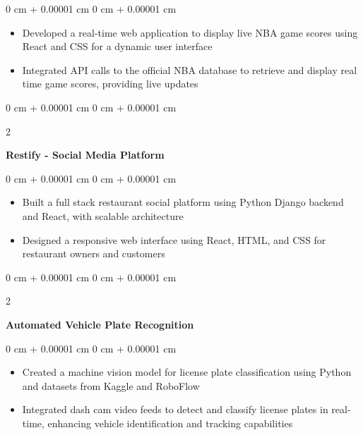 \documentclass[10pt, letterpaper]{article}
\newenvironment{highlights}{
    \begin{itemize}[
        topsep=0.10 cm,
        parsep=0.10 cm,
        partopsep=0pt,
        itemsep=0pt,
        leftmargin=0 cm + 10pt
    ]
}{
    \end{itemize}
} %
\newenvironment{onecolentry}{
    \begin{adjustwidth}{
        0 cm + 0.00001 cm
    }{
        0 cm + 0.00001 cm
    }
}{
    \end{adjustwidth}
} %
\newenvironment{twocolentry}[2][]{
    \onecolentry
    \def\secondColumn{#2}
    \setcolumnwidth{\fill, 4.5 cm}
    \begin{paracol}{2}
}{
    \switchcolumn \raggedleft \secondColumn
    \end{paracol}
    \endonecolentry
} %
\begin{document}
    \vspace{0.10 cm}
    \begin{onecolentry}
        \begin{highlights}
            \item Developed a real-time web application to display live NBA game scores using React and CSS for a dynamic user interface
            \item Integrated API calls to the official NBA database to retrieve and display real time game scores, providing live updates 
        \end{highlights}
    \end{onecolentry}
    
    \vspace{0.2 cm}
    
    \begin{twocolentry}{}
        \textbf{Restify - Social Media Platform}
    \end{twocolentry}
    
    \vspace{0.10 cm}
    \begin{onecolentry}
        \begin{highlights}
            \item Built a full stack restaurant social platform using Python Django backend and React, with scalable architecture
            \item Designed a responsive web interface using React, HTML, and CSS for restaurant owners and customers
        \end{highlights}
    \end{onecolentry}
    
    
    \vspace{0.2 cm}
    
    \begin{twocolentry}{}
        \textbf{Automated Vehicle Plate Recognition}
    \end{twocolentry}
    
    \vspace{0.10 cm}
    \begin{onecolentry}
        \begin{highlights}
            \item Created a machine vision model for license plate classification using Python and datasets from Kaggle and RoboFlow
            \item  Integrated dash cam video feeds to detect and classify license plates in real-time, enhancing vehicle identification and tracking capabilities
        \end{highlights}
    \end{onecolentry}
    
\end{document}
